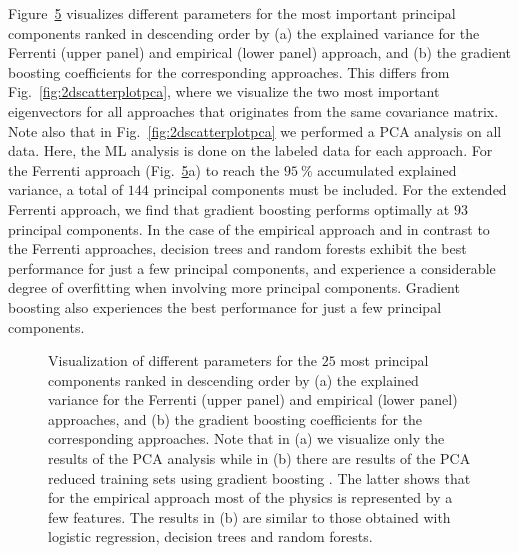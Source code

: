 \documentclass[superscriptaddress,unsortedaddress,
 amsmath,amssymb,
 aps,
]{revtex4-2}
\begin{document}
Figure~\ref{fig:PComponents} visualizes different parameters for the most important principal components ranked in descending order by (a) the explained variance for the Ferrenti (upper panel) and empirical (lower panel) approach, and (b) the gradient boosting coefficients for the corresponding approaches. This differs from Fig.~\ref{fig:2dscatterplotpca}, where we visualize the two most important eigenvectors for all approaches that originates from the same covariance matrix. Note also that in  Fig.~\ref{fig:2dscatterplotpca} we performed a PCA analysis on all data. Here, the ML analysis is done on the labeled data for each approach. For the Ferrenti approach (Fig.~\ref{fig:PComponents}a) to reach the $95 \ \%$ accumulated explained variance, a total of $144$ principal components must be included. For the extended Ferrenti approach, we find that gradient boosting performs optimally at $93$ principal components. 
In the case of the empirical approach and in contrast to the Ferrenti approaches, decision trees and random forests exhibit the best performance for just a few principal components, and experience a considerable degree of overfitting when involving more principal components. Gradient boosting 
also experiences the best performance for just a few principal components. 

\begin{figure}[t]
    \centering
    \begin{subfigure}[b]{0.45\textwidth}
        
        \label{fig:01-fi-e}
    \end{subfigure}
    \begin{subfigure}[b]{0.45\textwidth}
        
        \label{fig:01-fi-d}
    \end{subfigure}%
    \hfill
    \begin{subfigure}[b]{0.45\textwidth}
        
        \label{fig:03-fi-e}
        \subcaption{}
    \end{subfigure}
    \begin{subfigure}[b]{0.45\textwidth}
        
        \label{fig:03-fi-d}
        \subcaption{}
    \end{subfigure}
    \caption{Visualization of different parameters for the $25$ most principal components ranked in descending order by (a) the explained variance for the Ferrenti (upper panel) and empirical (lower panel) approaches, and (b) the gradient boosting coefficients for the corresponding approaches. Note that in (a) we visualize only the results of the PCA analysis while in (b) there are results of the PCA reduced training sets using gradient boosting \cite{Hastie2009,xgboost2016}. The latter shows that for the empirical approach most of the physics is represented by a few features. The results in (b) are similar to those obtained with logistic regression, decision trees and random forests.  
    }
    \label{fig:PComponents}
\end{figure}
\end{document}
